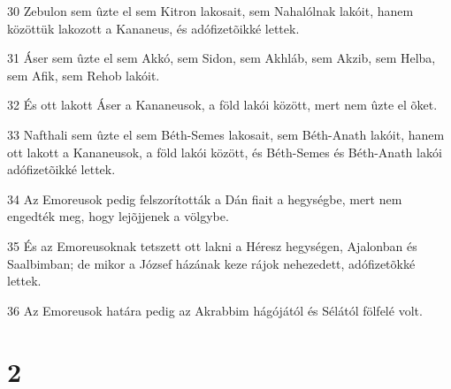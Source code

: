 \par 30 Zebulon sem ûzte el sem Kitron lakosait, sem Nahalólnak lakóit, hanem közöttük lakozott a Kananeus, és adófizetõikké lettek.
\par 31 Áser sem ûzte el sem Akkó, sem Sidon, sem Akhláb, sem Akzib, sem Helba, sem Afik, sem Rehob lakóit.
\par 32 És ott lakott Áser a Kananeusok, a föld lakói között, mert nem ûzte el õket.
\par 33 Nafthali sem ûzte el sem Béth-Semes lakosait, sem Béth-Anath lakóit, hanem ott lakott a Kananeusok, a föld lakói között, és Béth-Semes és Béth-Anath lakói adófizetõikké lettek.
\par 34 Az Emoreusok pedig felszorították a Dán fiait a hegységbe, mert nem engedték meg, hogy lejõjjenek a völgybe.
\par 35 És az Emoreusoknak tetszett ott lakni a Héresz hegységen, Ajalonban és Saalbimban; de mikor a József házának keze rájok nehezedett, adófizetõkké lettek.
\par 36 Az Emoreusok határa pedig az Akrabbim hágójától és Sélától fölfelé volt.

\chapter{2}

